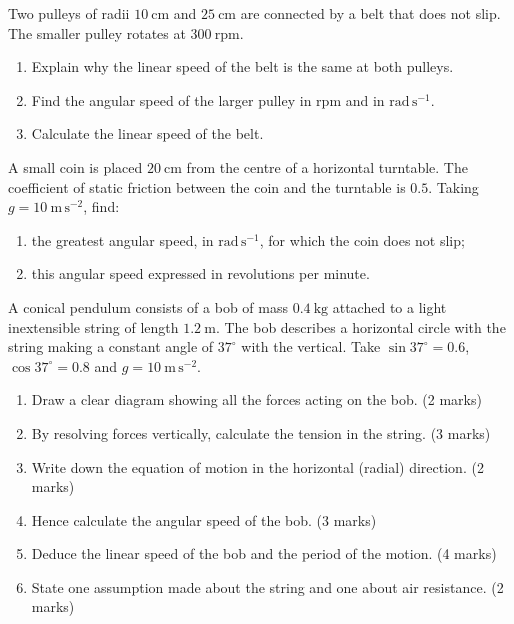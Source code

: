 \documentclass[11pt]{article}
\newcounter{popsec}
\newcounter{popsub}
\newcommand{\courssub}[1]{%
  \stepcounter{popsub}%
  \par\vspace{9pt}\noindent{\popxbold\fontsize{11.5}{13}\selectfont\color{popink}{\color{poporange}\thepopsec.\thepopsub}\hspace{6pt}#1}\par\nopagebreak\vspace{4pt}
}
\begin{document}
\begin{exercice}
Two pulleys of radii $10\ \mathrm{cm}$ and $25\ \mathrm{cm}$ are connected by a belt that does not slip. The smaller pulley rotates at $300\ \mathrm{rpm}$.
\begin{enumerate}
\item Explain why the linear speed of the belt is the same at both pulleys.
\item Find the angular speed of the larger pulley in $\mathrm{rpm}$ and in $\mathrm{rad\,s^{-1}}$.
\item Calculate the linear speed of the belt.
\end{enumerate}
\end{exercice}

\begin{exercice}
A small coin is placed $20\ \mathrm{cm}$ from the centre of a horizontal turntable. The coefficient of static friction between the coin and the turntable is $0.5$. Taking $g = 10\ \mathrm{m\,s^{-2}}$, find:
\begin{enumerate}
\item the greatest angular speed, in $\mathrm{rad\,s^{-1}}$, for which the coin does not slip;
\item this angular speed expressed in revolutions per minute.
\end{enumerate}
\end{exercice}

\courssub{I prepare for the GCE}

\begin{exercice}
A conical pendulum consists of a bob of mass $0.4\ \mathrm{kg}$ attached to a light inextensible string of length $1.2\ \mathrm{m}$. The bob describes a horizontal circle with the string making a constant angle of $37^{\circ}$ with the vertical. Take $\sin 37^{\circ} = 0.6$, $\cos 37^{\circ} = 0.8$ and $g = 10\ \mathrm{m\,s^{-2}}$.
\begin{enumerate}
\item Draw a clear diagram showing all the forces acting on the bob. \hfill (2 marks)
\item By resolving forces vertically, calculate the tension in the string. \hfill (3 marks)
\item Write down the equation of motion in the horizontal (radial) direction. \hfill (2 marks)
\item Hence calculate the angular speed of the bob. \hfill (3 marks)
\item Deduce the linear speed of the bob and the period of the motion. \hfill (4 marks)
\item State one assumption made about the string and one about air resistance. \hfill (2 marks)
\end{enumerate}
\end{exercice}
\end{document}
